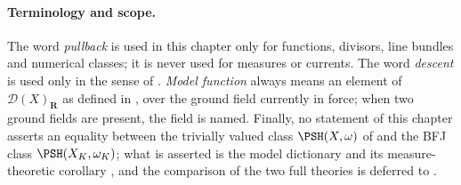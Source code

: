 \paragraph{Terminology and scope.}
The word \emph{pullback} is used in this chapter only for functions,
divisors, line bundles and numerical classes; it is never used for measures
or currents.  The word \emph{descent} is used only in the sense of
.  \emph{Model function} always means an
element of \(\mathcal D(X)_{\mathbf R}\) as defined in
, over the ground field currently in force;
when two ground fields are present, the field is named.  Finally, no
statement of this chapter asserts an equality between the trivially valued
class \(\PSH(X,\omega)\) of  and the BFJ class
\(\PSH(X_K,\omega_K)\); what is asserted is the model dictionary
 and its measure-theoretic corollary
, and the comparison of the two full theories
is deferred to .
